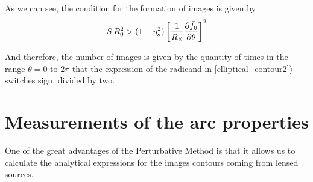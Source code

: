 
As we can see, the condition for the formation of images is given by
\begin{equation*}
S\,R^2_0>(1-\eta^2_s)\left[\frac{1}{R_{\mathrm{E}}}\dfrac{\partial \bar{f}_0}{\partial
\theta}\right]^2
\end{equation*}

And therefore, the number of images is given by the quantity of times
in the range $\theta = 0 $ to $2 \pi$ that the expression of the
radicand in \eqref{elliptical_contour2}) switches sign, divided by
two.


\section{Measurements of the arc properties}

One of the great advantages of the Perturbative Method is that it
allows us to calculate the analytical expressions for the images contours
coming from lensed sources.

